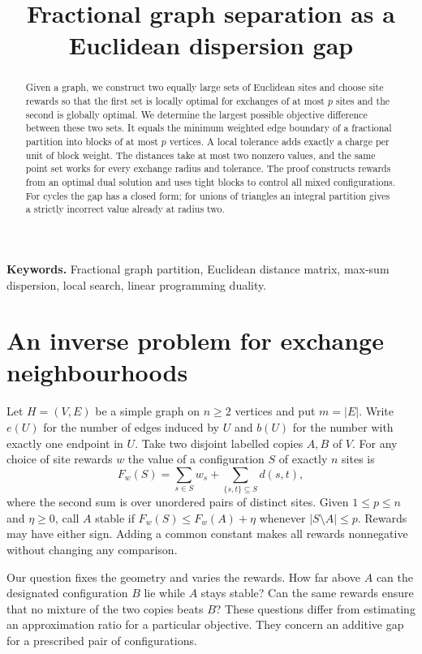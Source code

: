 \documentclass[11pt]{article}
\title{Fractional graph separation as a Euclidean dispersion gap}
\author{}
\date{}
\begin{document}
\maketitle
\begin{abstract}
Given a graph, we construct two equally large sets of Euclidean sites and choose site rewards so that the first set is locally optimal for exchanges of at most $p$ sites and the second is globally optimal. We determine the largest possible objective difference between these two sets. It equals the minimum weighted edge boundary of a fractional partition into blocks of at most $p$ vertices. A local tolerance adds exactly a charge per unit of block weight. The distances take at most two nonzero values, and the same point set works for every exchange radius and tolerance. The proof constructs rewards from an optimal dual solution and uses tight blocks to control all mixed configurations. For cycles the gap has a closed form; for unions of triangles an integral partition gives a strictly incorrect value already at radius two.
\end{abstract}
\noindent\textbf{Keywords.} Fractional graph partition, Euclidean distance matrix, max-sum dispersion, local search, linear programming duality.

\section{An inverse problem for exchange neighbourhoods}
Let $H=(V,E)$ be a simple graph on $n\ge2$ vertices and put $m=|E|$. Write $e(U)$ for the number of edges induced by $U$ and $b(U)$ for the number with exactly one endpoint in $U$. Take two disjoint labelled copies $A,B$ of $V$. For any choice of site rewards $w$ the value of a configuration $S$ of exactly $n$ sites is
\[
 F_w(S)=\sum_{s\in S}w_s+\sum_{\{s,t\}\subseteq S}d(s,t),
\]
where the second sum is over unordered pairs of distinct sites. Given $1\le p\le n$ and $\eta\ge0$, call $A$ stable if $F_w(S)\le F_w(A)+\eta$ whenever $|S\setminus A|\le p$. Rewards may have either sign. Adding a common constant makes all rewards nonnegative without changing any comparison.

Our question fixes the geometry and varies the rewards. How far above $A$ can the designated configuration $B$ lie while $A$ stays stable? Can the same rewards ensure that no mixture of the two copies beats $B$? These questions differ from estimating an approximation ratio for a particular objective. They concern an additive gap for a prescribed pair of configurations.
\end{document}
